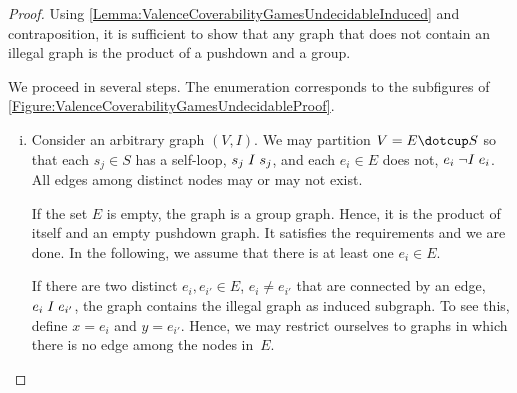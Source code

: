 \documentclass[../../diss.tex]{subfiles}
\begin{document}
\begin{proof}
    Using \cref{Lemma:ValenceCoverabilityGamesUndecidableInduced} and contraposition, it is sufficient to show that any graph that does not contain an illegal graph is the product of a pushdown and a group.

    We proceed in several steps.
    The enumeration corresponds to the subfigures of \cref{Figure:ValenceCoverabilityGamesUndecidableProof}.

    \begin{enumerate}[i)]
        \item
            Consider an arbitrary graph $(V,I)$.
            We may partition $V = E \dotcup S$ so that each $s_j \in S$ has a self-loop, $s_j \mathrel{I} s_j$, and each $e_i \in E$ does not, $e_i \mathrel{\neg I} e_i$.
            All edges among distinct nodes may or may not exist.

            If the set $E$ is empty, the graph is a group graph.
            Hence, it is the product of itself and an empty pushdown graph.
            It satisfies the requirements and we are done.
            In the following, we assume that there is at least one $e_i \in E$.

            If there are two distinct $e_i, e_{i'} \in E$, $e_i \neq e_{i'}$ that are connected by an edge, $e_i \mathrel{I} e_{i'}$, the graph contains the  illegal graph as induced subgraph.
            To see this, define $x = e_i$ and $y = e_{i'}$.
            Hence, we may restrict ourselves to graphs in which there is no edge among the nodes in~$E$.


\end{enumerate}
\end{proof}
\end{document}
